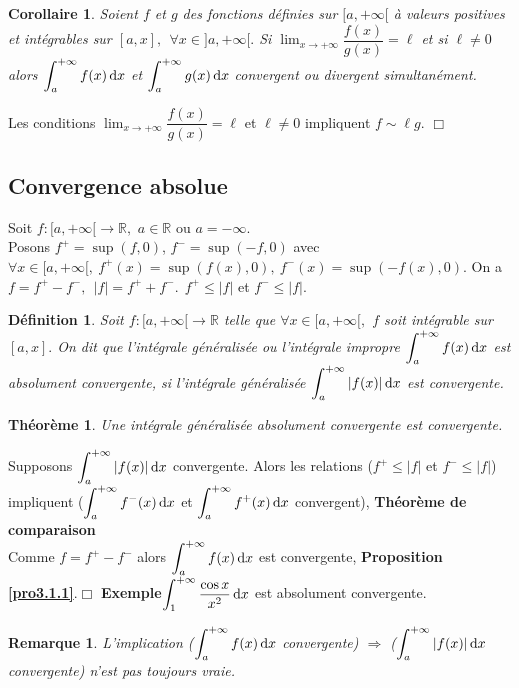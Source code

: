 \documentclass[11pt, a4paper]{book}
\newtheorem{teo}{Th\'eor\`eme}[section]
\newtheorem{defi}{D\'efinition}[section]
\newtheorem{rem}{Remarque}[section]
\newtheorem{cor}{Corollaire}[section]
\newenvironment{pr}{\noindent {\bf Preuve} \noindent} {\hfill $\Box$\vskip 5mm}
\begin{document}
\begin{cor} Soient $f$ et $g$ des fonctions d\'efinies sur $[a,+\infty[$ \`a valeurs positives et int\'egrables sur $[a,x],~~\forall x\in ]a,+\infty[.$ Si ${\displaystyle \lim_{x\rightarrow+\infty}\dfrac{f(x)}{g(x)}=\ell}$ et si $\ell\neq0$ alors ${\displaystyle \int_a^{+\infty}f(x)\,\mathrm{d} x}$ et ${\displaystyle \int_a^{+\infty}g(x)\,\mathrm{d} x}$ convergent ou divergent simultan\'ement. 
\end{cor}
\begin{pr}\quad Les conditions ${\displaystyle \lim_{x\rightarrow+\infty}\dfrac{f(x)}{g(x)}=\ell}$ et $\ell\neq0$ impliquent $f\sim \ell g.$
\end{pr}

\subsection{Convergence absolue}
Soit $f:[a,+\infty[\longrightarrow \mathbb{R},$ $a\in \mathbb{R}$ ou $a=-\infty.$ \\Posons $f^+= \sup (f,0)$, $f^-=\sup (-f,0)$ avec $\forall x\in [a,+\infty[, ~f^+(x)=\sup (f(x),0),~f^-(x)=\sup(-f(x),0).$ On a $f=f^+-f^-,~~|f|=f^++f^-.~~f^+\leq |f|$ et $f^-\leq |f|.$
\begin{defi} Soit $f:[a,+\infty[\longrightarrow \mathbb{R}$ telle que $\forall x\in [a,+\infty[,$ $f$ soit int\'egrable sur $[a,x].$ On dit que l'int\'egrale g\'en\'eralis\'ee ou l'int\'egrale impropre ${\displaystyle \int_a^{+\infty} f(x)\,\mathrm{d} x}$ est absolument convergente, si l'int\'egrale g\'en\'eralis\'ee ${\displaystyle \int_a^{+\infty} |f(x)|\,\mathrm{d} x}$ est convergente. 
\end{defi}
\begin{teo} \label{teo3.2.2}
Une int\'egrale g\'en\'eralis\'ee absolument convergente est convergente.
\end{teo}
\begin{pr}\quad
Supposons ${\displaystyle \int_a^{+\infty} |f(x)|\,\mathrm{d} x}$ convergente. Alors les relations ($f^+\leq |f|$ et $f^-\leq |f|$) impliquent (${\displaystyle \int_a^{+\infty} f^-(x)\,\mathrm{d} x}$ et ${\displaystyle \int_a^{+\infty} f^+(x)\,\mathrm{d} x}$ convergent), \textbf{Th\'eor\`eme de comparaison}\\
Comme $f=f^+-f^-$ alors ${\displaystyle \int_a^{+\infty} f(x)\,\mathrm{d} x}$ est convergente, \textbf{Proposition \ref{pro3.1.1}}.\end{pr}
\textbf{Exemple}\quad ${\displaystyle \int_1^{+\infty} \dfrac{\cos x}{x^2}\,\mathrm{d} x}$ est absolument convergente.
\begin{rem} \label{rem3.2.1}
L'implication (${\displaystyle \int_a^{+\infty} f(x)\,\mathrm{d} x}$ convergente) $\Longrightarrow$ (${\displaystyle \int_a^{+\infty} |f(x)|\,\mathrm{d} x}$ convergente) n'est pas toujours vraie.
\end{rem}
\end{document}
